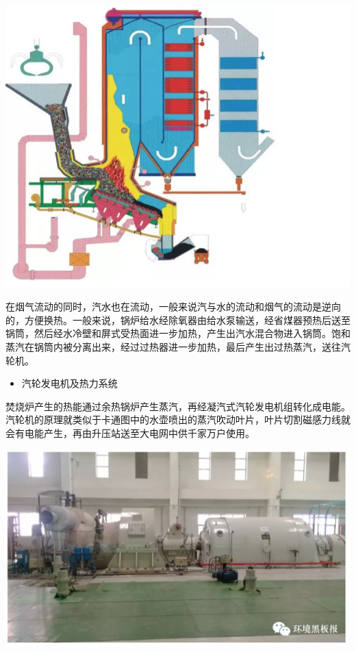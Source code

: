 \documentclass[]{book}
\providecommand{\tightlist}{%
  \setlength{\itemsep}{0pt}\setlength{\parskip}{0pt}}
\begin{document}
\includegraphics[width=8.33in]{images/ljfs5}

在烟气流动的同时，汽水也在流动，一般来说汽与水的流动和烟气的流动是逆向的，方便换热。一般来说，锅炉给水经除氧器由给水泵输送，经省煤器预热后送至锅筒，然后经水冷壁和屏式受热面进一步加热，产生出汽水混合物进入锅筒。饱和蒸汽在锅筒内被分离出来，经过过热器进一步加热，最后产生出过热蒸汽，送往汽轮机。

\begin{itemize}
\tightlist
\item
  汽轮发电机及热力系统
\end{itemize}

焚烧炉产生的热能通过余热锅炉产生蒸汽，再经凝汽式汽轮发电机组转化成电能。汽轮机的原理就类似于卡通图中的水壶喷出的蒸汽吹动叶片，叶片切割磁感力线就会有电能产生，再由升压站送至大电网中供千家万户使用。

\includegraphics[width=8.33in]{images/ljfs6}
\end{document}
